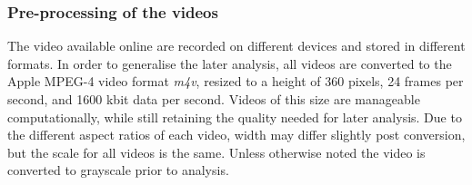 \subsubsection{Pre-processing of the videos}
%
The video available online are recorded on different devices and stored in different formats. In order to generalise the later analysis, all videos are converted to the Apple MPEG-4 video format \textit{m4v}, resized to a height of 360 pixels, 24 frames per second, and 1600 kbit data per second. Videos of this size are manageable computationally, while still retaining the quality needed for later analysis. Due to the different aspect ratios of each video, width may differ slightly post conversion, but the scale for all videos is the same. Unless otherwise noted the video is converted to grayscale prior to analysis.
%
%
%
%
%
%
%
%
